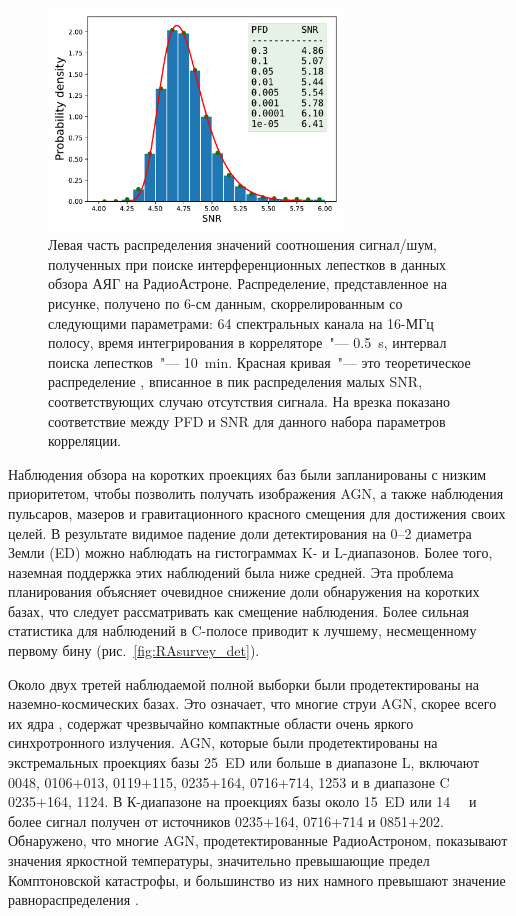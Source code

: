 \begin{figure}[tbh]
    \centering
    \includegraphics[width=0.7\textwidth,trim=0cm 0.5cm 0cm 0cm]{SNR_hist_C_64ch_05s_570s.pdf}
    \caption{Левая часть распределения значений соотношения сигнал/шум, полученных при поиске
интерференционных лепестков в данных обзора АЯГ на РадиоАстроне. Распределение, представленное на
рисунке, получено по 6-см данным, скоррелированным со следующими параметрами: 64 спектральных
канала на 16-МГц полосу, время интегрирования в корреляторе~"--- \SI{0.5}{\second}, интервал поиска
лепестков~"--- \SI{10}{\minute}.
Красная кривая~"--- это теоретическое распределение \cite{VLBIbook}, вписанное в пик распределения
малых SNR, соответствующих случаю отсутствия сигнала.
На врезка показано соответствие между PFD и SNR для данного набора параметров корреляции.}
    \label{fig:RAsurvey_pfd}
\end{figure}

Наблюдения обзора на коротких проекциях баз были запланированы с низким приоритетом,
чтобы позволить получать изображения AGN, а также наблюдения пульсаров, мазеров и гравитационного
красного смещения для достижения своих целей. В результате видимое падение доли детектирования на
0--2 диаметра Земли (ED) можно наблюдать на гистограммах K- и L-диапазонов. Более того, наземная
поддержка этих наблюдений была ниже средней. Эта проблема планирования объясняет очевидное снижение
доли обнаружения на коротких базах, что следует рассматривать как смещение наблюдения.
Более сильная статистика для наблюдений в C-полосе приводит к лучшему, несмещенному первому бину
(рис.~\ref{fig:RAsurvey_det}).

Около двух третей наблюдаемой полной выборки были продетектированы на наземно-космических базах. Это
означает, что многие струи AGN, скорее всего их ядра \cite{Kovalev_2005}, содержат чрезвычайно
компактные области очень яркого синхротронного излучения. AGN, которые были продетектированы на
экстремальных проекциях базы 25~ED или больше в диапазоне L, включают 0048, 0106+013,
0119+115, 0235+164, 0716+714, 1253 и в диапазоне C 0235+164, 1124. В
К-диапазоне на проекциях базы около 15~ED или \SI{14}{\giga\la} и более сигнал получен от источников
0235+164, 0716+714 и 0851+202. Обнаружено, что многие AGN, продетектированные РадиоАстроном,
показывают значения яркостной температуры, значительно превышающие предел Комптоновской катастрофы,
и большинство из них намного превышают значение равнораспределения
\cite{Kellermann_1969,Readhead_1994}.

